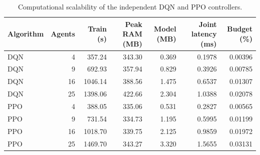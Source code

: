 \begin{table}[htbp]
\centering
\caption{Computational scalability of the independent DQN and PPO controllers.}
\label{tab:computational_scalability_v2}
\small
\begin{tabular}{lrrrrrr}
\hline
Algorithm & Agents & Train (s) & Peak RAM (MB) & Model (MB) & Joint latency (ms) & Budget (\%) \\
\hline
DQN & 4 & 357.24 & 343.30 & 0.369 & 0.1978 & 0.00396 \\
DQN & 9 & 692.93 & 357.94 & 0.829 & 0.3926 & 0.00785 \\
DQN & 16 & 1046.14 & 388.56 & 1.475 & 0.6537 & 0.01307 \\
DQN & 25 & 1398.06 & 422.66 & 2.304 & 1.0388 & 0.02078 \\
PPO & 4 & 388.05 & 335.06 & 0.531 & 0.2827 & 0.00565 \\
PPO & 9 & 731.54 & 334.73 & 1.195 & 0.5995 & 0.01199 \\
PPO & 16 & 1018.70 & 339.75 & 2.125 & 0.9859 & 0.01972 \\
PPO & 25 & 1469.70 & 343.27 & 3.320 & 1.5655 & 0.03131 \\
\hline
\end{tabular}
\end{table}
